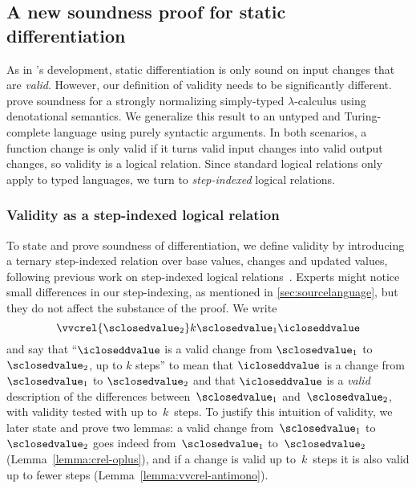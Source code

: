 \subsection{A new soundness proof for static differentiation}
\label{sec:sound-derive}

As in \citet{CaiEtAl2014ILC}'s development, static differentiation is
only sound on input changes that are \emph{valid}. However, our
definition of validity needs to be significantly different.
%
\citeauthor{CaiEtAl2014ILC} prove soundness for a strongly normalizing
simply-typed $\lambda$-calculus using denotational semantics. We generalize this
result to an untyped and Turing-complete language using purely syntactic
arguments. In both scenarios, a function change is only valid if it turns valid
input changes into valid output changes, so validity is a logical relation.
Since standard logical relations only apply to typed languages, we turn to
\emph{step-indexed} logical relations.

\subsubsection{Validity as a step-indexed logical relation}
To state and prove soundness of differentiation, we define validity by
introducing a ternary step-indexed relation over base values, changes and
updated values, following previous work on step-indexed
logical relations~\citep{Ahmed2006stepindexed,Acar08}. Experts might notice
small differences in our step-indexing, as mentioned in
\cref{sec:sourcelanguage}, but they do not affect the substance of the proof.
%
We write
\[\vvcrel {\sclosedvalue_2} k {\sclosedvalue_1} \icloseddvalue\]
\noindent and say that ``$\icloseddvalue$ is a valid change from
$\sclosedvalue_1$ to $\sclosedvalue_2$, up to $k$ steps'' to mean that
$\icloseddvalue$ is a change from $\sclosedvalue_1$ to
$\sclosedvalue_2$ and that $\icloseddvalue$ is a \emph{valid}
description of the differences between~$\sclosedvalue_1$ 
and~$\sclosedvalue_2$, with validity tested with up to~$k$~steps.
%
To justify this intuition of validity, we later state and prove two
lemmas: a valid change from~$\sclosedvalue_1$ to~$\sclosedvalue_2$
goes indeed from~$\sclosedvalue_1$ to~$\sclosedvalue_2$
(Lemma~\ref{lemma:crel-oplus}), and if a change is valid up to~$k$~steps it
is also valid up to fewer steps (Lemma~\ref{lemma:vvcrel-antimono}).

